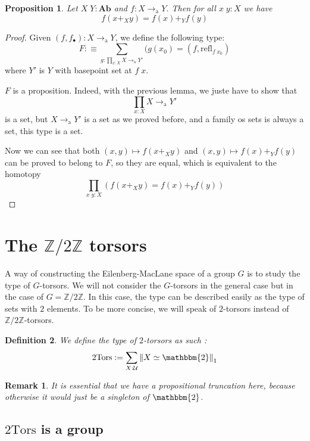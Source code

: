 \documentclass{article}
\newtheorem{defi}{Definition}
\newtheorem{prop}[defi]{Proposition}
\newtheorem{rmk}{Remark}
\newcommand{\toa}[0]{\to_\mathrm a}
\newcommand{\btwo}[0]{\mathbbm{2}}
\newcommand{\twotors}[0]{2\mathrm{Tors}}
\begin{document}
\begin{prop}
    Let $X\;Y : \textbf{Ab}$ and $f : X \toa Y$. Then for all $x\;y : X$ we have
    $$f(x+_Xy) = f(x)+_Yf(y)$$
\end{prop}

\begin{proof}
    Given $(f,f_\bullet) : X \toa Y$, we define the following type:
    $$F:\equiv \sum_{g : \prod_{x : X} X \toa Y'} (g(x_0) = (f,\mathrm{refl}_{f\;x_0})$$ 
    where $Y'$ is $Y$ with basepoint set at $f\;x$.

    $F$ is a proposition. Indeed, with the previous lemma, we juste have to show that 
    $$\prod_{x : X}X\toa Y'$$ is a set, but $X \toa Y'$ is a set as we proved before, and a family os sets
    is always a set, this type is a set.

    Now we can see that both $(x,y)\mapsto f(x+_Xy)$ and $(x,y)\mapsto f(x)+_Yf(y)$ can be proved to belong to
    $F$, so they are equal, which is equivalent to the homotopy 
    $$\prod_{x\;y : X}(f(x+_Xy)=f(x)+_Yf(y))$$
\end{proof}

\section{The $\mathbb Z/2\mathbb Z$ torsors}

A way of constructing the Eilenberg-MacLane space of a group $G$ is to study the type of $G$-torsors. We will
not consider the $G$-torsors in the general case but in the case of $G = \mathbb Z/2\mathbb Z$. In this case,
the type can be described easily as the type of sets with $2$ elements. To be more concise, we will speak of
$2$-torsors instead of $\mathbb Z/2\mathbb Z$-torsors.

\begin{defi}
    We define the type of $2$-torsors as such :
    $$2\mathrm{Tors} := \sum_{X : \mathcal U} \left\| X \simeq \btwo \right\|_1$$
\end{defi}

\begin{rmk}
    It is essential that we have a propositional truncation here, because otherwise it would just be a
    singleton of $\btwo$.
\end{rmk}

\subsection{$\twotors$ is a group}
\end{document}

